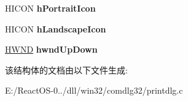 \begin{DoxyCompactItemize}
\mbox{\label{struct_p_r_i_n_t___p_t_r_a_a719697eae3da723dc495cbe961203793}} 
H\+I\+C\+ON {\bfseries h\+Portrait\+Icon}
\item 
\mbox{\label{struct_p_r_i_n_t___p_t_r_a_a9c2359f32e6977db6dc00a2a3a438aa0}} 
H\+I\+C\+ON {\bfseries h\+Landscape\+Icon}
\item 
\mbox{\label{struct_p_r_i_n_t___p_t_r_a_a7084ab84bca884d49a276bc3db69c979}} 
\hyperlink{interfacevoid}{H\+W\+ND} {\bfseries hwnd\+Up\+Down}
\end{DoxyCompactItemize}


该结构体的文档由以下文件生成\+:\begin{DoxyCompactItemize}
\item 
E\+:/\+React\+O\+S-\/0../dll/win32/comdlg32/printdlg.\+c\end{DoxyCompactItemize}
